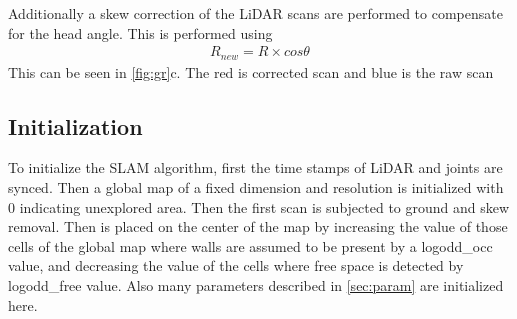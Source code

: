 \documentclass[fleqn,10pt]{SelfArx} %
\begin{document}
Additionally a skew correction of the LiDAR scans are performed to compensate for the head angle. This is performed using
\begin{align*}
R_{new} = R \times cos\theta
\end{align*}
This can be seen in \ref{fig:gr}c. The red is corrected scan and blue is the raw scan

\subsection{Initialization}
\label{subsec:init}
To initialize the SLAM algorithm, first the time stamps of LiDAR and joints are synced. Then a global map of a fixed dimension and resolution is initialized with 0 indicating unexplored area. Then the first scan is subjected to ground and skew removal. Then is placed on the center of the map by increasing the value of those cells of the global map where walls are assumed to be present by a logodd\_occ value, and decreasing the value of the cells where free space is detected by logodd\_free value. Also many parameters described in \ref{sec:param} are initialized here.
\end{document}
